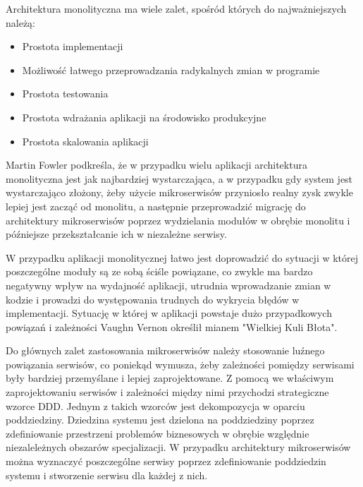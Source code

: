 \par
Architektura monolityczna ma wiele zalet\cite{book:microservices-patterns}, spośród których do najważniejszych należą:
\begin{itemize}
    \item Prostota implementacji
    \item Możliwość łatwego przeprowadzania radykalnych zmian w programie
    \item Prostota testowania
    \item Prostota wdrażania aplikacji na środowisko produkcyjne
    \item Prostota skalowania aplikacji
\end{itemize}

\par
Martin Fowler podkreśla, że w przypadku wielu aplikacji architektura monolityczna jest jak najbardziej wystarczająca,
a w przypadku gdy system jest wystarczająco złożony, żeby użycie mikroserwisów przyniosło realny zysk zwykle lepiej jest zacząć od monolitu,
a następnie przeprowadzić migrację do architektury mikroserwisów poprzez wydzielania modułów w obrębie monolitu i późniejsze przekształcanie ich w niezależne serwisy\cite{url:monolith-first}.

\par
W przypadku aplikacji monolitycznej łatwo jest doprowadzić do sytuacji w której poszczególne moduły są ze sobą ściśle powiązane, co zwykle ma bardzo negatywny wpływ na wydajność aplikacji, utrudnia wprowadzanie zmian w kodzie i prowadzi do występowania trudnych do wykrycia błędów w implementacji.
Sytuację w której w aplikacji powstaje dużo przypadkowych powiązań i zależności Vaughn Vernon określił mianem "Wielkiej Kuli Błota"\cite{book:ddd-kompendium}.

\par
Do głównych zalet zastosowania mikroserwisów należy stosowanie luźnego powiązania serwisów, co poniekąd wymusza, żeby zależności pomiędzy serwisami były bardziej przemyślane i lepiej zaprojektowane.
Z pomocą we właściwym zaprojektowaniu serwisów i zależności między nimi przychodzi strategiczne wzorce DDD.
Jednym z takich wzorców jest dekompozycja w oparciu poddziedziny\cite{book:ddd-evans}.
Dziedzina systemu jest dzielona na poddziedziny poprzez zdefiniowanie przestrzeni problemów biznesowych w obrębie względnie niezaleleżnych obszarów specjalizacji.
W przypadku architektury mikroserwisów można wyznaczyć poszczególne serwisy poprzez zdefiniowanie poddziedzin systemu i stworzenie serwisu dla każdej z nich\cite{book:microservices-patterns}.

